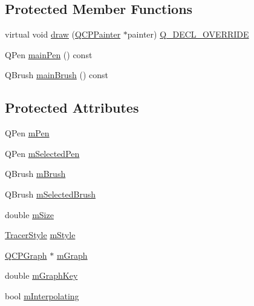 \subsection*{Protected Member Functions}
\begin{DoxyCompactItemize}
\item 
virtual void \mbox{\hyperlink{class_q_c_p_item_tracer_a11f187ffea436434f3b5cfc387811967}{draw}} (\mbox{\hyperlink{class_q_c_p_painter}{Q\+C\+P\+Painter}} $\ast$painter) \mbox{\hyperlink{qcustomplot_8h_a42cc5eaeb25b85f8b52d2a4b94c56f55}{Q\+\_\+\+D\+E\+C\+L\+\_\+\+O\+V\+E\+R\+R\+I\+DE}}
\item 
Q\+Pen \mbox{\hyperlink{class_q_c_p_item_tracer_abffdcf64d0f84f7b41bd4af07d144642}{main\+Pen}} () const
\item 
Q\+Brush \mbox{\hyperlink{class_q_c_p_item_tracer_a94f81c54197577e86c53a60cf39155cd}{main\+Brush}} () const
\end{DoxyCompactItemize}
\subsection*{Protected Attributes}
\begin{DoxyCompactItemize}
\item 
Q\+Pen \mbox{\hyperlink{class_q_c_p_item_tracer_a579e3bd6bd16d6aaff03638dc8a99a69}{m\+Pen}}
\item 
Q\+Pen \mbox{\hyperlink{class_q_c_p_item_tracer_a3f61829784200819661d1e2a5354d866}{m\+Selected\+Pen}}
\item 
Q\+Brush \mbox{\hyperlink{class_q_c_p_item_tracer_a6597be63a17a266233941354200b2340}{m\+Brush}}
\item 
Q\+Brush \mbox{\hyperlink{class_q_c_p_item_tracer_a1c15d2adde40efdcc0ef1ff78fd256a6}{m\+Selected\+Brush}}
\item 
double \mbox{\hyperlink{class_q_c_p_item_tracer_a575153a24bb357d1e006f6bc3bd099b9}{m\+Size}}
\item 
\mbox{\hyperlink{class_q_c_p_item_tracer_a2f05ddb13978036f902ca3ab47076500}{Tracer\+Style}} \mbox{\hyperlink{class_q_c_p_item_tracer_afb1f236bebf417544e0138fef22a292e}{m\+Style}}
\item 
\mbox{\hyperlink{class_q_c_p_graph}{Q\+C\+P\+Graph}} $\ast$ \mbox{\hyperlink{class_q_c_p_item_tracer_a2d70cf616b579563aa15f796dfc143ac}{m\+Graph}}
\item 
double \mbox{\hyperlink{class_q_c_p_item_tracer_a8fa20f2e9ee07d21fd7c8d30ba4702ca}{m\+Graph\+Key}}
\item 
bool \mbox{\hyperlink{class_q_c_p_item_tracer_afab37c22ad39f235921e86f93cd84595}{m\+Interpolating}}
\end{DoxyCompactItemize}
